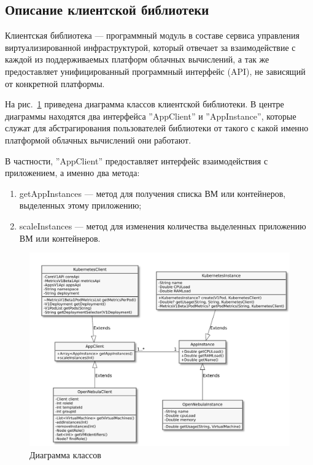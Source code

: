 \subsection{Описание клиентской библиотеки}
Клиентская библиотека --- программный модуль в составе сервиса управления виртуализированной инфраструктурой, который отвечает за взаимодействие с каждой из поддерживаемых платформ облачных вычислений, а так же предоставляет унифицированный программный интерфейс (API), не зависящий от конкретной платформы.

На рис.~\ref{lib-classes} приведена диаграмма классов клиентской библиотеки.
В центре диаграммы находятся два интерфейса ''AppClient'' и ''AppInstance'', которые служат для абстрагирования пользователей библиотеки от такого с какой именно платформой облачных вычислений они работают.

В частности, ''AppClient'' предоставляет интерфейс взаимодействия с приложением, а именно два метода:
\begin{enumerate}
    \item getAppInstances --- метод для получения списка ВМ или контейнеров, выделенных этому приложению;
    \item scaleInstances --- метод для изменения количества выделенных приложению ВМ или контейнеров.
\end{enumerate}

\begin{figure}[H]
    \centering
    \includegraphics[width=\textwidth]{img/lib-classes.pdf}
    \caption{Диаграмма классов}
    \label{lib-classes}
\end{figure}

